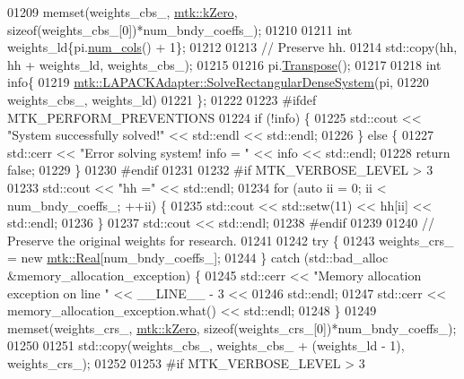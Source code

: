 \begin{DoxyCode}
{{01209   memset(weights\_cbs\_, \hyperlink{group__c01-roots_ga59a451a5fae30d59649bcda274fea271}{mtk::kZero}, \textcolor{keyword}{sizeof}(weights\_cbs\_[0])*num\_bndy\_coeffs\_);
01210 
01211   \textcolor{keywordtype}{int} weights\_ld\{pi.\hyperlink{classmtk_1_1DenseMatrix_a41747502d468c6728a4be31501b16e0e}{num\_cols}() + 1\};
01212 
01213   \textcolor{comment}{// Preserve hh.}
01214   std::copy(hh, hh + weights\_ld, weights\_cbs\_);
01215 
01216   pi.\hyperlink{classmtk_1_1DenseMatrix_a71d9c07ca66e88d97d1fd5012f43138b}{Transpose}();
01217 
01218   \textcolor{keywordtype}{int} info\{
01219     \hyperlink{classmtk_1_1LAPACKAdapter_a380f148ffdf96bae2f79ae28f1a6560c}{mtk::LAPACKAdapter::SolveRectangularDenseSystem}(pi,
01220                                                     weights\_cbs\_, weights\_ld)
01221   \};
01222 
01223 \textcolor{preprocessor}{  #ifdef MTK\_PERFORM\_PREVENTIONS}
01224   \textcolor{keywordflow}{if} (!info) \{
01225     std::cout << \textcolor{stringliteral}{"System successfully solved!"} << std::endl << std::endl;
01226   \} \textcolor{keywordflow}{else} \{
01227     std::cerr << \textcolor{stringliteral}{"Error solving system! info = "} << info << std::endl;
01228     \textcolor{keywordflow}{return} \textcolor{keyword}{false};
01229   \}
01230 \textcolor{preprocessor}{  #endif}
01231 
01232 \textcolor{preprocessor}{  #if MTK\_VERBOSE\_LEVEL > 3}
01233   std::cout << \textcolor{stringliteral}{"hh ="} << std::endl;
01234   \textcolor{keywordflow}{for} (\textcolor{keyword}{auto} ii = 0; ii < num\_bndy\_coeffs\_; ++ii) \{
01235     std::cout << std::setw(11) << hh[ii] << std::endl;
01236   \}
01237   std::cout << std::endl;
01238 \textcolor{preprocessor}{  #endif}
01239 
01240   \textcolor{comment}{// Preserve the original weights for research.}
01241 
01242   \textcolor{keywordflow}{try} \{
01243     weights\_crs\_ = \textcolor{keyword}{new} \hyperlink{group__c01-roots_gac080bbbf5cbb5502c9f00405f894857d}{mtk::Real}[num\_bndy\_coeffs\_];
01244   \} \textcolor{keywordflow}{catch} (std::bad\_alloc &memory\_allocation\_exception) \{
01245     std::cerr << \textcolor{stringliteral}{"Memory allocation exception on line "} << \_\_LINE\_\_ - 3 <<
01246       std::endl;
01247     std::cerr << memory\_allocation\_exception.what() << std::endl;
01248   \}
01249   memset(weights\_crs\_, \hyperlink{group__c01-roots_ga59a451a5fae30d59649bcda274fea271}{mtk::kZero}, \textcolor{keyword}{sizeof}(weights\_crs\_[0])*num\_bndy\_coeffs\_);
01250 
01251   std::copy(weights\_cbs\_, weights\_cbs\_ + (weights\_ld - 1), weights\_crs\_);
01252 
01253 \textcolor{preprocessor}{  #if MTK\_VERBOSE\_LEVEL > 3}
}}
\end{DoxyCode}

